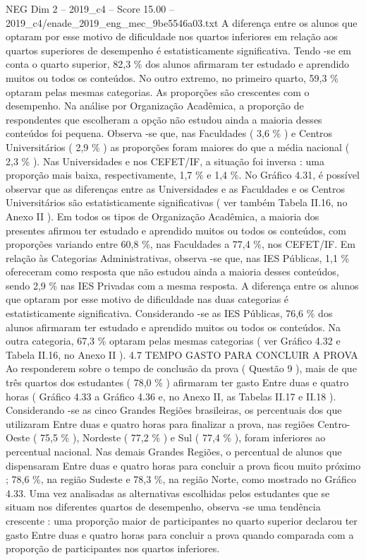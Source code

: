 \begin{textsample}{NEG Dim 2 – 2019\_c4 – Score 15.00 – 2019\_c4/enade\_2019\_eng\_mec\_9be5546a03.txt}
A diferença entre os alunos que optaram por esse motivo de dificuldade nos quartos inferiores em relação aos quartos superiores de desempenho é estatisticamente significativa.
Tendo -se em conta o quarto superior, 82,3 \% dos alunos afirmaram ter estudado e aprendido muitos ou todos os conteúdos.
No outro extremo, no primeiro quarto, 59,3 \% optaram pelas mesmas categorias.
As proporções são crescentes com o desempenho.
Na análise por Organização Acadêmica, a proporção de respondentes que escolheram a opção não estudou ainda a maioria desses conteúdos foi pequena.
Observa -se que, nas Faculdades ( 3,6 \% ) e Centros Universitários ( 2,9 \% ) as proporções foram maiores do que a média nacional ( 2,3 \% ).
Nas Universidades e nos CEFET/IF, a situação foi inversa : uma proporção mais baixa, respectivamente, 1,7 \% e 1,4 \%.
No Gráfico 4.31, é possível observar que as diferenças entre as Universidades e as Faculdades e os Centros Universitários são estatisticamente significativas ( ver também Tabela II.16, no Anexo II ).
Em todos os tipos de Organização Acadêmica, a maioria dos presentes afirmou ter estudado e aprendido muitos ou todos os conteúdos, com proporções variando entre 60,8 \%, nas Faculdades a 77,4 \%, nos CEFET/IF.
Em relação às Categorias Administrativas, observa -se que, nas IES Públicas, 1,1 \% ofereceram como resposta que não estudou ainda a maioria desses conteúdos, sendo 2,9 \% nas IES Privadas com a mesma resposta.
A diferença entre os alunos que optaram por esse motivo de dificuldade nas duas categorias é estatisticamente significativa.
Considerando -se as IES Públicas, 76,6 \% dos alunos afirmaram ter estudado e aprendido muitos ou todos os conteúdos.
Na outra categoria, 67,3 \% optaram pelas mesmas categorias ( ver Gráfico 4.32 e Tabela II.16, no Anexo II ). 4.7 TEMPO GASTO PARA CONCLUIR A PROVA Ao responderem sobre o tempo de conclusão da prova ( Questão 9 ), mais de que três quartos dos estudantes ( 78,0 \% ) afirmaram ter gasto Entre duas e quatro horas ( Gráfico 4.33 a Gráfico 4.36 e, no Anexo II, as Tabelas II.17 e II.18 ).
Considerando -se as cinco Grandes Regiões brasileiras, os percentuais dos que utilizaram Entre duas e quatro horas para finalizar a prova, nas regiões Centro-Oeste ( 75,5 \% ), Nordeste ( 77,2 \% ) e Sul ( 77,4 \% ), foram inferiores ao percentual nacional.
Nas demais Grandes Regiões, o percentual de alunos que dispensaram Entre duas e quatro horas para concluir a prova ficou muito próximo ; 78,6 \%, na região Sudeste e 78,3 \%, na região Norte, como mostrado no Gráfico 4.33.
Uma vez analisadas as alternativas escolhidas pelos estudantes que se situam nos diferentes quartos de desempenho, observa -se uma tendência crescente : uma proporção maior de participantes no quarto superior declarou ter gasto Entre duas e quatro horas para concluir a prova quando comparada com a proporção de participantes nos quartos inferiores.

\end{textsample}
